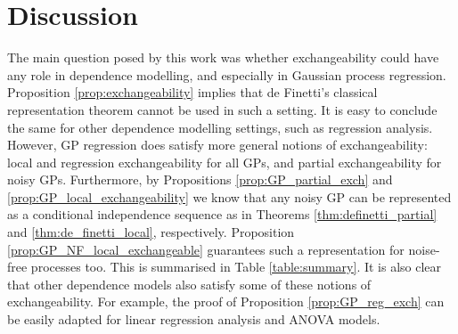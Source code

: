 

\section{Discussion} \label{section:discussion}


The main question posed by this work was whether exchangeability could have any role in dependence modelling, and especially in Gaussian process regression. Proposition \ref{prop:exchangeability} implies that de Finetti's classical representation theorem cannot be used in such a setting. It is easy to conclude the same for other dependence modelling settings, such as regression analysis. 
\\


However, GP regression does satisfy more general notions of exchangeability: local and regression exchangeability for all GPs, and partial exchangeability for noisy GPs. Furthermore, by Propositions \ref{prop:GP_partial_exch} and \ref{prop:GP_local_exchangeability} we know that any noisy GP can be represented as a conditional independence sequence as in Theorems \ref{thm:definetti_partial} and \ref{thm:de_finetti_local}, respectively. Proposition \ref{prop:GP_NF_local_exchangeable} guarantees such a representation for noise-free processes too. This is summarised in Table \ref{table:summary}. It is also clear that other dependence models also satisfy some of these notions of exchangeability. For example, the proof of Proposition \ref{prop:GP_reg_exch} can be easily adapted for linear regression analysis and ANOVA models.
\\






